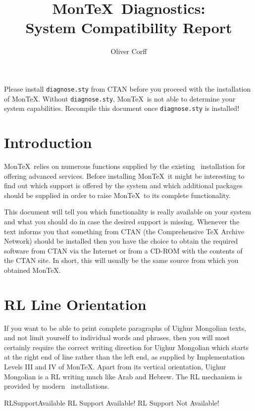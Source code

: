 \documentclass[11pt,a4paper]{article}
\title{Mon\TeX\ Diagnostics:\\
	System Compatibility Report}
\author{Oliver Corff}
\newif\ifBadNews
\begin{document}
\maketitle

\ifBadNews
	Please install \texttt{diagnose.sty} from CTAN before you
	proceed with the installation of Mon\TeX. Without
	\texttt{diagnose.sty}, Mon\TeX\ is not able to determine
	your system capabilities. Recompile this document once
	\texttt{diagnose.sty} is installed!
\else
\section{Introduction}

Mon\TeX\ relies on numerous functions supplied by the existing
\LaTeXe\ installation for offering advanced services. Before installing
Mon\TeX\ it might be interesting to find out which support is offered
by the system and which additional packages should be supplied in order
to raise Mon\TeX\ to its complete functionality.

This document will tell you which functionality is really available on
your system and
what you should do in case the desired support is missing. Whenever the
text informs you that something from CTAN (the Comprehensive TeX Archive
Network) should be installed then you have the choice to obtain the
required software from CTAN via the Internet or from a CD-ROM with the 
contents of the CTAN site. In short, this will usually be the same source
from which you obtained Mon\TeX.


\section{RL Line Orientation\label{RLSupport}}

If you want to be able to print complete paragraphs of Uighur Mongolian 
texts, and not limit yourself to individual words and phrases, then you
will most certainly require the correct writing direction for Uighur 
Mongolian which starts at the right end of line rather than the left end,
as supplied by Implementation Levels III and IV of Mon\TeX.
Apart from its vertical orientation, Uighur Mongolian is a RL writing
much like Arab and Hebrew. The RL mechanism is provided by modern
\LaTeXe\ installations.

\TokenDiagnostics%
	{\TeXXeTstate}				%
	{RLSupportAvailable}			%
	{RL Support Available!}			%
	{RL Support Not Available!}		%
\end{document}
